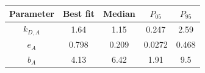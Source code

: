 \begin{tabular}{ccccc}
\toprule
Parameter & Best fit & Median & $P_{05}$ & $P_{95}$\\
\midrule
$k_{D,A}$ & 1.64 & 1.15 & 0.247 & 2.59\\
$e_A$ & 0.798 & 0.209 & 0.0272 & 0.468\\
$b_A$ & 4.13 & 6.42 & 1.91 & 9.5\\
\bottomrule
\end{tabular}
